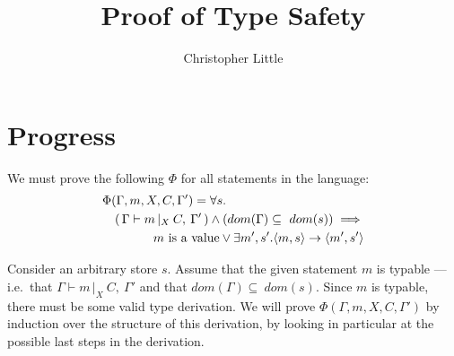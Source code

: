 \documentclass[a4paper]{article}
\begin{document}
\title{Proof of Type Safety}
\author{Christopher Little}
\maketitle

\section*{Progress}
	\newcommand{\typable}[2][ ]{\Gamma{}\vdash#2\, |_X#1\:C#1,\:\Gamma#1'}
	\newcommand{\typed}[2]{\Gamma{}\vdash#1: #2\,|_X\:C,\:\Gamma'}
	\newcommand{\transition}[4]{\langle{}#1,#2\rangle{}\rightarrow{}\langle{}#3,#4\rangle}
	\newcommand{\indHyp}{\Phi(\Gamma, m, X, C, \Gamma')}
	\newcommand{\indHypTwo}{\Psi(\Gamma, e, T, X, C, \Gamma')}
	\newcommand{\var}{\textbf{var}}
	\newcommand{\sub}[1]{\textsubscript{#1}}

	We must prove the following $\Phi$ for all statements in the language:
	\begin{eqnarray*}
	\lefteqn{ \indHyp =  \forall s.} \\
		& & (\,\typable{m}\,) \wedge
				(dom(\Gamma) \subseteq\ dom(s))
			\implies \\
		& & \quad \textrm{$m$ is a value} \vee
				\exists m', s'. \transition{m}{s}{m'}{s'} \\
	\end{eqnarray*}

	Consider an arbitrary store $s$. Assume that the given statement $m$ is
	typable --- i.e.\ that $\typable{m}$ and that $dom(\Gamma) \subseteq\ dom(s)$.
	Since $m$ is typable, there must be some valid type derivation. We will
	prove $\indHyp$ by induction over the structure of this derivation, by
	looking in particular at the possible last steps in the derivation.
	
	\vspace{2ex}
\end{document}

